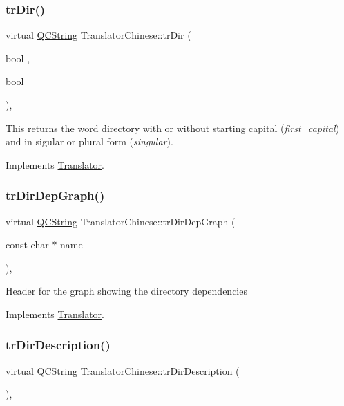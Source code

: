 \subsubsection{\texorpdfstring{trDir()}{trDir()}}
{\footnotesize\ttfamily virtual \mbox{\hyperlink{class_q_c_string}{Q\+C\+String}} Translator\+Chinese\+::tr\+Dir (\begin{DoxyParamCaption}\item[{bool}]{,  }\item[{bool}]{ }\end{DoxyParamCaption})\hspace{0.3cm}{\ttfamily [inline]}, {\ttfamily [virtual]}}

This returns the word directory with or without starting capital ({\itshape first\+\_\+capital}) and in sigular or plural form ({\itshape singular}). 

Implements \mbox{\hyperlink{class_translator}{Translator}}.

\mbox{\label{class_translator_chinese_a6fd55ce82e675b31fc8c55c0b99c22a9}} 
\subsubsection{\texorpdfstring{trDirDepGraph()}{trDirDepGraph()}}
{\footnotesize\ttfamily virtual \mbox{\hyperlink{class_q_c_string}{Q\+C\+String}} Translator\+Chinese\+::tr\+Dir\+Dep\+Graph (\begin{DoxyParamCaption}\item[{const char $\ast$}]{name }\end{DoxyParamCaption})\hspace{0.3cm}{\ttfamily [inline]}, {\ttfamily [virtual]}}

Header for the graph showing the directory dependencies 

Implements \mbox{\hyperlink{class_translator}{Translator}}.

\mbox{\label{class_translator_chinese_a5fd68cf98e467a72b56c061c0ff78e96}} 
\subsubsection{\texorpdfstring{trDirDescription()}{trDirDescription()}}
{\footnotesize\ttfamily virtual \mbox{\hyperlink{class_q_c_string}{Q\+C\+String}} Translator\+Chinese\+::tr\+Dir\+Description (\begin{DoxyParamCaption}{ }\end{DoxyParamCaption})\hspace{0.3cm}{\ttfamily [inline]}, {\ttfamily [virtual]}}

